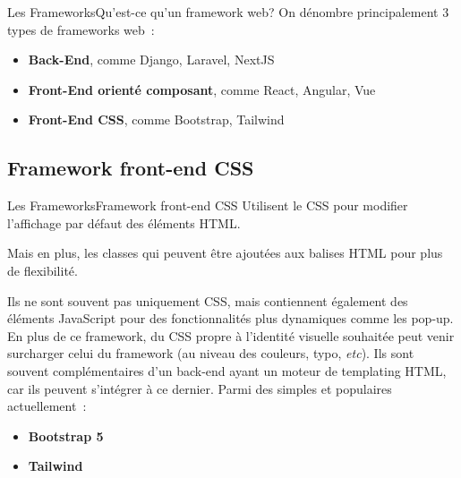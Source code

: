 \documentclass{beamer}
\begin{document}
    \begin{frame}{Les Frameworks}{Qu'est-ce qu'un framework web?}
        On dénombre principalement 3 types de frameworks web~:
        \begin{itemize}
            \item \textbf{Back-End}, comme Django, Laravel, NextJS
            \item \textbf{Front-End orienté composant}, comme React, Angular, Vue
            \item \textbf{Front-End CSS}, comme Bootstrap, Tailwind
        \end{itemize}
    \end{frame}

    \subsection{Framework front-end CSS}\label{subsec:framewok-css}

    \begin{frame}{Les Frameworks}{Framework front-end CSS}
        Utilisent le CSS pour modifier l'affichage par défaut des éléments HTML.

        Mais en plus, les classes qui peuvent être ajoutées aux balises HTML pour plus de flexibilité.

        Ils ne sont souvent pas uniquement CSS, mais contiennent également des éléments JavaScript pour des fonctionnalités plus dynamiques comme les pop-up.
        \bigbreak
        En plus de ce framework, du CSS propre à l'identité visuelle souhaitée peut venir surcharger celui du framework (au niveau des couleurs, typo, \textit{etc}).
        \bigbreak
        Ils sont souvent complémentaires d'un back-end ayant un moteur de templating HTML, car ils peuvent s'intégrer à ce dernier.
        \bigbreak
        Parmi des simples et populaires actuellement~:
        \begin{itemize}
            \item \textbf{Bootstrap 5}
            \item \textbf{Tailwind}
        \end{itemize}
    \end{frame}
\end{document}
